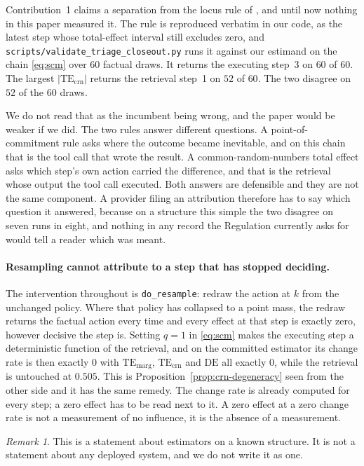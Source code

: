 \documentclass[11pt]{article}
\theoremstyle{remark}
\newtheorem*{remark}{Remark}
\newcommand{\TEmarg}{\mathrm{TE}_{\mathrm{marg}}}
\newcommand{\TEcrn}{\mathrm{TE}_{\mathrm{crn}}}
\newcommand{\DE}{\mathrm{DE}}
\begin{document}
Contribution~1 claims a separation from the locus rule of \citet{car2026}, and
until now nothing in this paper measured it. The rule is reproduced verbatim in
our code, as the latest step whose total-effect interval still excludes zero, and
\texttt{scripts/validate\_triage\_closeout.py} runs it against our estimand on the
chain \eqref{eq:scm} over $60$ factual draws. It returns the executing step~3 on
$60$ of $60$. The largest $|\TEcrn|$ returns the retrieval step~1 on $52$ of
$60$. The two disagree on $52$ of the $60$ draws.

We do not read that as the incumbent being wrong, and the paper would be weaker
if we did. The two rules answer different questions. A point-of-commitment rule
asks where the outcome became inevitable, and on this chain that is the tool call
that wrote the result. A common-random-numbers total effect asks which step's own
action carried the difference, and that is the retrieval whose output the tool
call executed. Both answers are defensible and they are not the same component. A
provider filing an attribution therefore has to say which question it answered,
because on a structure this simple the two disagree on seven runs in eight, and
nothing in any record the Regulation currently asks for would tell a reader which
was meant.

\paragraph{Resampling cannot attribute to a step that has stopped deciding.} The
intervention throughout is \texttt{do\_resample}: redraw the action at $k$ from
the unchanged policy. Where that policy has collapsed to a point mass, the redraw
returns the factual action every time and every effect at that step is exactly
zero, however decisive the step is. Setting $q = 1$ in \eqref{eq:scm} makes the
executing step a deterministic function of the retrieval, and on the committed
estimator its change rate is then exactly $0$ with $\TEmarg$, $\TEcrn$ and $\DE$
all exactly $0$, while the retrieval is untouched at $0.505$. This is
Proposition~\ref{prop:crn-degeneracy} seen from the other side and it has the
same remedy. The change rate is already computed for every step; a zero effect
has to be read next to it. A zero effect at a zero change rate is not a
measurement of no influence, it is the absence of a measurement.

\begin{remark}
This is a statement about estimators on a known structure. It is not a statement
about any deployed system, and we do not write it as one.
\end{remark}
\end{document}
